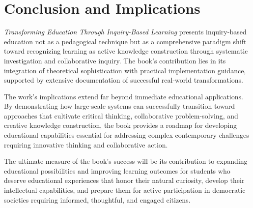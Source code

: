 \documentclass[
  Letterpaper,
]{scrbook}
\begin{document}
\section{Conclusion and Implications}\label{conclusion-and-implications}

\emph{Transforming Education Through Inquiry-Based Learning} presents
inquiry-based education not as a pedagogical technique but as a
comprehensive paradigm shift toward recognizing learning as active
knowledge construction through systematic investigation and
collaborative inquiry. The book's contribution lies in its integration
of theoretical sophistication with practical implementation guidance,
supported by extensive documentation of successful real-world
transformations.

The work's implications extend far beyond immediate educational
applications. By demonstrating how large-scale systems can successfully
transition toward approaches that cultivate critical thinking,
collaborative problem-solving, and creative knowledge construction, the
book provides a roadmap for developing educational capabilities
essential for addressing complex contemporary challenges requiring
innovative thinking and collaborative action.

The ultimate measure of the book's success will be its contribution to
expanding educational possibilities and improving learning outcomes for
students who deserve educational experiences that honor their natural
curiosity, develop their intellectual capabilities, and prepare them for
active participation in democratic societies requiring informed,
thoughtful, and engaged citizens.


\backmatter
\end{document}
